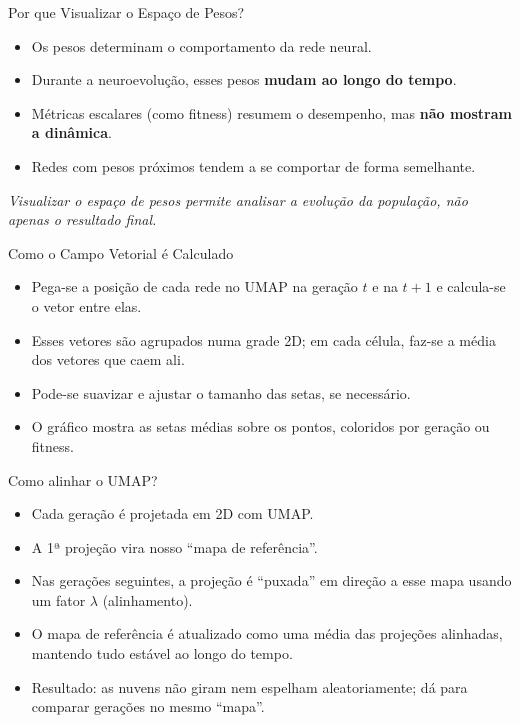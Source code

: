 \documentclass[aspectratio=169]{beamer}
\begin{document}
\begin{frame}{Por que Visualizar o Espaço de Pesos?}

\begin{itemize}
  \item Os pesos determinam o comportamento da rede neural.
  \item Durante a neuroevolução, esses pesos \textbf{mudam ao longo do tempo}.
  \item Métricas escalares (como fitness) resumem o desempenho, mas \textbf{não mostram a dinâmica}.
  \item Redes com pesos próximos tendem a se comportar de forma semelhante.
\end{itemize}

\vspace{0.25cm}
\centering
\textit{Visualizar o espaço de pesos permite analisar a evolução da população, não apenas o resultado final.}

\end{frame}

\begin{frame}{Como o Campo Vetorial é Calculado}

\begin{itemize}
  \item Pega-se a posição de cada rede no UMAP na geração $t$ e na $t{+}1$ e calcula-se o vetor entre elas.
  \item Esses vetores são agrupados numa grade 2D; em cada célula, faz-se a média dos vetores que caem ali.
  \item Pode-se suavizar e ajustar o tamanho das setas, se necessário.
  \item O gráfico mostra as setas médias sobre os pontos, coloridos por geração ou fitness.
\end{itemize}

\end{frame}

\begin{frame}{Como alinhar o UMAP?}

\begin{itemize}
  \item Cada geração é projetada em 2D com UMAP.
  \item A 1ª projeção vira nosso “mapa de referência”.
  \item Nas gerações seguintes, a projeção é “puxada” em direção a esse mapa usando um fator $\lambda$ (alinhamento).
  \item O mapa de referência é atualizado como uma média das projeções alinhadas, mantendo tudo estável ao longo do tempo.
  \item Resultado: as nuvens não giram nem espelham aleatoriamente; dá para comparar gerações no mesmo “mapa”.
\end{itemize}

\end{frame}
\end{document}
